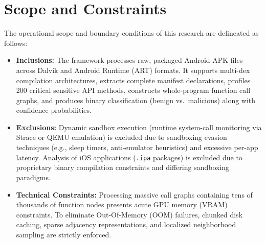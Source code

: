 \documentclass[12pt,a4paper,oneside]{report}
\begin{document}
\section{Scope and Constraints}
The operational scope and boundary conditions of this research are delineated as follows:
\begin{itemize}
    \item \textbf{Inclusions:} The framework processes raw, packaged Android APK files across Dalvik and Android Runtime (ART) formats. It supports multi-dex compilation architectures, extracts complete manifest declarations, profiles 200 critical sensitive API methods, constructs whole-program function call graphs, and produces binary classification (benign vs.\ malicious) along with confidence probabilities.
    \item \textbf{Exclusions:} Dynamic sandbox execution (runtime system-call monitoring via Strace or QEMU emulation) is excluded due to sandboxing evasion techniques (e.g., sleep timers, anti-emulator heuristics) and excessive per-app latency. Analysis of iOS applications (\texttt{.ipa} packages) is excluded due to proprietary binary compilation constraints and differing sandboxing paradigms.
    \item \textbf{Technical Constraints:} Processing massive call graphs containing tens of thousands of function nodes presents acute GPU memory (VRAM) constraints. To eliminate Out-Of-Memory (OOM) failures, chunked disk caching, sparse adjacency representations, and localized neighborhood sampling are strictly enforced.
\end{itemize}
\end{document}
